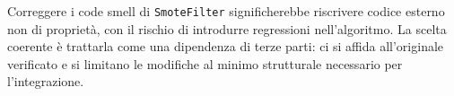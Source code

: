 Correggere i code smell di \texttt{SmoteFilter} significherebbe riscrivere codice esterno
non di proprietà, con il rischio di introdurre regressioni nell'algoritmo. La scelta
coerente è trattarla come una dipendenza di terze parti: ci si affida all'originale
verificato e si limitano le modifiche al minimo strutturale necessario per l'integrazione.
